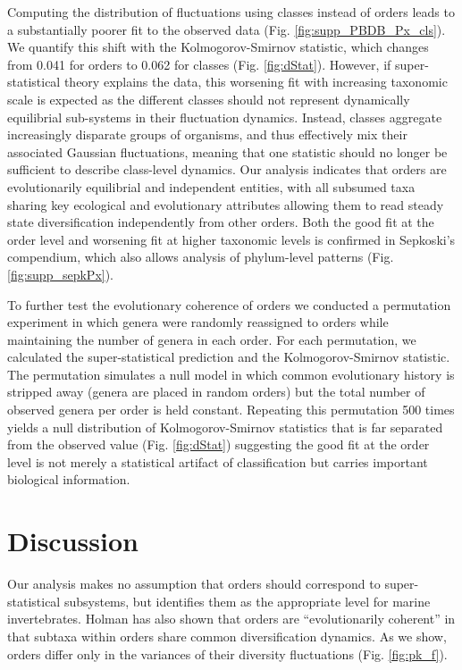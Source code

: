 \documentclass[12pt]{article}
\let\citep=\autocite
\begin{document}
Computing the distribution of fluctuations using classes instead of
orders leads to a substantially poorer fit to the observed data
(Fig. \ref{fig:supp_PBDB_Px_cls}). We quantify this shift with the
Kolmogorov-Smirnov statistic, which changes from 0.041 for orders to
0.062 for classes (Fig. \ref{fig:dStat}). However, if
super-statistical theory explains the data, this worsening fit with
increasing taxonomic scale is expected as the different classes should
not represent dynamically equilibrial sub-systems in their fluctuation
dynamics. Instead, classes aggregate increasingly disparate groups of
organisms, and thus effectively mix their associated Gaussian
fluctuations, meaning that one statistic should no longer be
sufficient to describe class-level dynamics. Our analysis indicates
that orders are evolutionarily equilibrial and independent entities,
with all subsumed taxa sharing key ecological and evolutionary
attributes allowing them to read steady state diversification
independently from other orders. Both the good fit at the order level
and worsening fit at higher taxonomic levels is confirmed in
Sepkoski's compendium, which also allows analysis of phylum-level
patterns (Fig. \ref{fig:supp_sepkPx}).

To further test the evolutionary coherence of orders we conducted a
permutation experiment in which genera were randomly reassigned to
orders while maintaining the number of genera in each order. For each
permutation, we calculated the super-statistical prediction and the
Kolmogorov-Smirnov statistic. The permutation simulates a null model
in which common evolutionary history is stripped away (genera are
placed in random orders) but the total number of observed genera per
order is held constant.  Repeating this permutation 500 times yields a
null distribution of Kolmogorov-Smirnov statistics that is far
separated from the observed value (Fig. \ref{fig:dStat}) suggesting
the good fit at the order level is not merely a statistical artifact
of classification but carries important biological information.

\section*{Discussion}

Our analysis makes no assumption that orders should correspond to
super-statistical subsystems, but identifies them as the appropriate
level for marine invertebrates. Holman \citep{holman1989} has also
shown that orders are ``evolutionarily coherent'' in that subtaxa
within orders share common diversification dynamics. As we show,
orders differ only in the variances of their diversity fluctuations
(Fig. \ref{fig:pk_f}).
\end{document}
